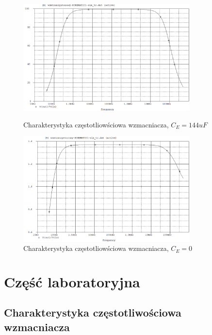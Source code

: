 \documentclass[a4paper,12pt]{article}
\begin{document}
\begin{figure}[h]
  \center
  \includegraphics[width=0.81\textwidth]{sim1.png}
  \caption{Charakterystyka częstotliowściowa wzmacniacza, $C_E = 144uF$}
  
    \includegraphics[width=0.81\textwidth]{sim2.png}
  \caption{Charakterystyka częstotliowściowa wzmacniacza, $C_E = 0$}
\end{figure}


\pagebreak
\section{Część laboratoryjna}
\subsection{Charakterystyka częstotliwościowa wzmacniacza}
\end{document}
